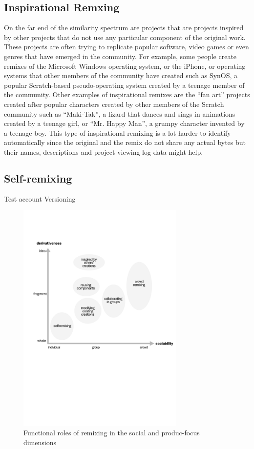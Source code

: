 \subsection{Inspirational Remxing}
On the far end of the similarity spectrum are projects that are projects inspired by other projects that do not use any particular component of the original work.
These projects are often trying to replicate popular software, video games or even genres that have emerged in the community.
For example, some people create remixes of the Microsoft Windows operating system, or the iPhone, or operating systems that other members of the community have created such as SynOS, a popular Scratch-based pseudo-operating system created by a teenage member of the community.
Other examples of inspirational remixes are the ``fan art'' projects created after popular characters created by other members of the Scratch community such as ``Maki-Tak'', a lizard that dances and sings in animations created by a teenage girl,  or  ``Mr. Happy Man'', a grumpy character invented by a teenage boy.
This type of inspirational remixing is a lot harder to identify automatically since the original and the remix do not share any actual bytes but their names, descriptions and project viewing log data might help. 

\subsection{Self-remixing}
Test account
Versioning

\begin{figure}
\centering
\includegraphics[width=3.25in]{figures/function.pdf}
\caption{Functional roles of remixing in the social and produc-focus dimensions}
\label{fig:function}
\end{figure}
